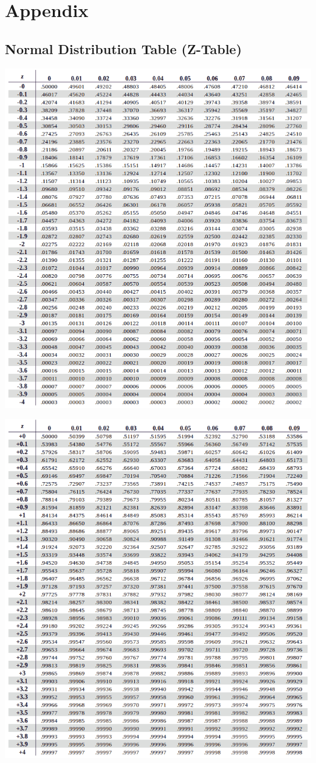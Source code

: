 \documentclass[12pt,letterpaper]{article} \usepackage{amsmath} \usepackage{graphicx} \usepackage[margin=1in]{geometry} \usepackage{longtable}  \usepackage{amssymb}
\begin{document}
	\newpage
	\section{Appendix}
	\subsection {Normal Distribution Table (Z-Table)}
	\begin{center}
		\includegraphics[width=0.99\linewidth]{negativeztable}
	\end{center}
	\begin{center}
		\includegraphics[width=0.99\linewidth]{positiveztable}
	\end{center}
\end{document}
